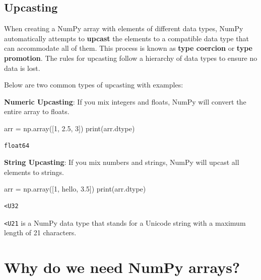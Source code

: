 \documentclass[
  letterpaper,
  DIV=11,
  numbers=noendperiod]{scrreprt}
\newenvironment{Shaded}{\begin{snugshade}}{\end{snugshade}}
\newcommand{\BuiltInTok}[1]{\textcolor[rgb]{0.00,0.23,0.31}{#1}}
\newcommand{\DecValTok}[1]{\textcolor[rgb]{0.68,0.00,0.00}{#1}}
\newcommand{\FloatTok}[1]{\textcolor[rgb]{0.68,0.00,0.00}{#1}}
\newcommand{\NormalTok}[1]{\textcolor[rgb]{0.00,0.23,0.31}{#1}}
\newcommand{\OperatorTok}[1]{\textcolor[rgb]{0.37,0.37,0.37}{#1}}
\newcommand{\StringTok}[1]{\textcolor[rgb]{0.13,0.47,0.30}{#1}}
\begin{document}
\hypertarget{upcasting}{%
\subsection{Upcasting}\label{upcasting}}

When creating a NumPy array with elements of different data types, NumPy
automatically attempts to \textbf{upcast} the elements to a compatible
data type that can accommodate all of them. This process is known as
\textbf{type coercion} or \textbf{type promotion}. The rules for
upcasting follow a hierarchy of data types to ensure no data is lost.

Below are two common types of upcasting with examples:

\textbf{Numeric Upcasting}: If you mix integers and floats, NumPy will
convert the entire array to floats.

\begin{Shaded}
\begin{Highlighting}[]
\NormalTok{arr }\OperatorTok{=}\NormalTok{ np.array([}\DecValTok{1}\NormalTok{, }\FloatTok{2.5}\NormalTok{, }\DecValTok{3}\NormalTok{])}
\BuiltInTok{print}\NormalTok{(arr.dtype)  }
\end{Highlighting}
\end{Shaded}

\begin{verbatim}
float64
\end{verbatim}

\textbf{String Upcasting}: If you mix numbers and strings, NumPy will
upcast all elements to strings.

\begin{Shaded}
\begin{Highlighting}[]
\NormalTok{arr }\OperatorTok{=}\NormalTok{ np.array([}\DecValTok{1}\NormalTok{, }\StringTok{\textquotesingle{}hello\textquotesingle{}}\NormalTok{, }\FloatTok{3.5}\NormalTok{])}
\BuiltInTok{print}\NormalTok{(arr.dtype)}
\end{Highlighting}
\end{Shaded}

\begin{verbatim}
<U32
\end{verbatim}

\texttt{\textless{}U21} is a NumPy data type that stands for a Unicode
string with a maximum length of 21 characters.

\hypertarget{why-do-we-need-numpy-arrays}{%
\section{Why do we need NumPy
arrays?}\label{why-do-we-need-numpy-arrays}}
\end{document}

